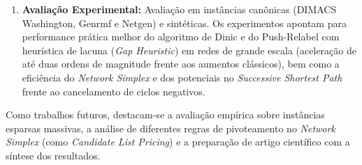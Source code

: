 \begin{enumerate}[leftmargin=1.5em, itemsep=0.2em, topsep=0.2em, parsep=0em]
    \item \textbf{Avaliação Experimental:} Avaliação em instâncias canônicas (DIMACS Washington, Genrmf e Netgen) e sintéticas. Os experimentos apontam para performance prática melhor do algoritmo de Dinic e do Push-Relabel com heurística de lacuna (\textit{Gap Heuristic}) em redes de grande escala (aceleração de até duas ordens de magnitude frente aos aumentos clássicos), bem como a eficiência do \textit{Network Simplex} e dos potenciais no \textit{Successive Shortest Path} frente ao cancelamento de ciclos negativos.
\end{enumerate}

Como trabalhos futuros, destacam-se a avaliação empírica sobre instâncias esparsas massivas, a análise de diferentes regras de pivoteamento no \textit{Network Simplex} (como \textit{Candidate List Pricing}) e a preparação de artigo científico com a síntese dos resultados.

